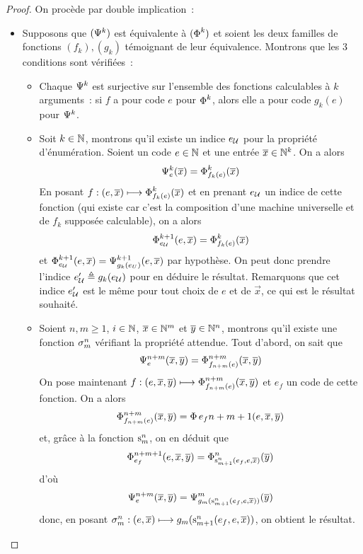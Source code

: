 \begin{proof}
  On procède par double implication~:
  \begin{itemize}
  \item Supposons que $(\Psi_{}^{k})$ est équivalente à $(\operatorname{\Phi}_{}^{k})$ et
    soient les deux familles de fonctions $(f_k),(g_k)$ témoignant de leur
    équivalence. Montrons que les $3$ conditions sont vérifiées~:
    \begin{itemize}
    \item Chaque $\Psi_{}^{k}$ est surjective sur l'ensemble des fonctions
      calculables à $k$ arguments~: si $f$ a pour code $e$ pour $\operatorname{\Phi}_{}^{k}$,
      alors elle a pour code $g_k(e)$ pour $\Psi_{}^{k}$.
    \item Soit $k \in \mathbb N$, montrons qu'il existe un indice $e_{\mathcal{U}}$ pour la
      propriété d'énumération. Soient un code $e \in \mathbb N$ et une entrée
      $\overline{x} \in \mathbb N^k$. On a alors
      \[\Psi_{e}^{k}(\overline{x}) = \operatorname{\Phi}_{f_k(e)}^{k}(\overline{x})\]
      En posant $f : (e, \overline{x}) \longmapsto \operatorname{\Phi}_{f_k(e)}^{k}(\overline{x})$ et en
      prenant $e_{\mathcal{U}}$ un indice de cette fonction (qui existe car c'est la
      composition d'une machine universelle et de $f_k$ supposée calculable), on
      a alors
      \[\operatorname{\Phi}_{e_{\mathcal{U}}}^{k+1}(e,\overline{x}) = \operatorname{\Phi}_{f_k(e)}^{k}(\overline{x})\]
      et $\operatorname{\Phi}_{e_{\mathcal{U}}}^{k+1}(e,\overline{x}) = \Psi_{g_k(e_U)}^{k+1}(e, \overline{x})$
      par hypothèse. On peut donc prendre l'indice
      $e'_{\mathcal{U}} \triangleq g_k(e_{\mathcal{U}})$ pour en déduire le résultat. Remarquons
      que cet indice $e'_{\mathcal{U}}$ est le même pour tout choix de $e$ et de
      $\vec x$, ce qui est le résultat souhaité.
    \item Soient $n,m \geq 1$, $i \in \mathbb N$, $\overline{x} \in \mathbb N^m$ et
      $\overline{y} \in \mathbb N^n$, montrons qu'il existe une fonction $\sigma_{m}^{n}$
      vérifiant la propriété attendue. Tout d'abord, on sait que
      \[\Psi_{e}^{n+m}(\overline{x}, \overline{y})=\operatorname{\Phi}_{f_{n+m}(e)}^{n+m}(\overline{x}, \overline{y})\]
      On pose maintenant
      $f:(e, \overline{x}, \overline{y}) \longmapsto \operatorname{\Phi}_{f_{n+m}(e)}^{n+m}(\overline{x},\overline{y})$
      et $e_f$ un code de cette fonction. On a alors
      \[\operatorname{\Phi}_{f_{n+m}(e)}^{n+m}(\overline{x}, \overline{y}) =
      \operatorname{\Phi}{e_f}{n+m+1}(e, \overline{x}, \overline{y})\]
      et, grâce à la fonction $\mathrm{s}_{m}^{n}$, on en déduit que
      \[\operatorname{\Phi}_{e_f}^{n+m+1}(e, \overline{x}, \overline{y}) =
      \operatorname{\Phi}_{\mathrm{s}_{m+1}^{n}(e_f,e, \overline{x})}^{n}(\overline{y})\]
      d'où
      \[\Psi_{e}^{n+m}(\overline{x}, \overline{y}) =
      \Psi_{g_m(\mathrm{s}_{m+1}^{n}(e_f,e,\overline{x}))}^{m}(\overline{y})\]
      donc, en posant
      $\sigma_{m}^{n} : (e, \overline{x}) \longmapsto g_m(\mathrm{s}_{m+1}^{n}(e_f,e,\overline{x}))$,
      on obtient le résultat.
    \end{itemize}


\end{itemize}
\end{proof}
